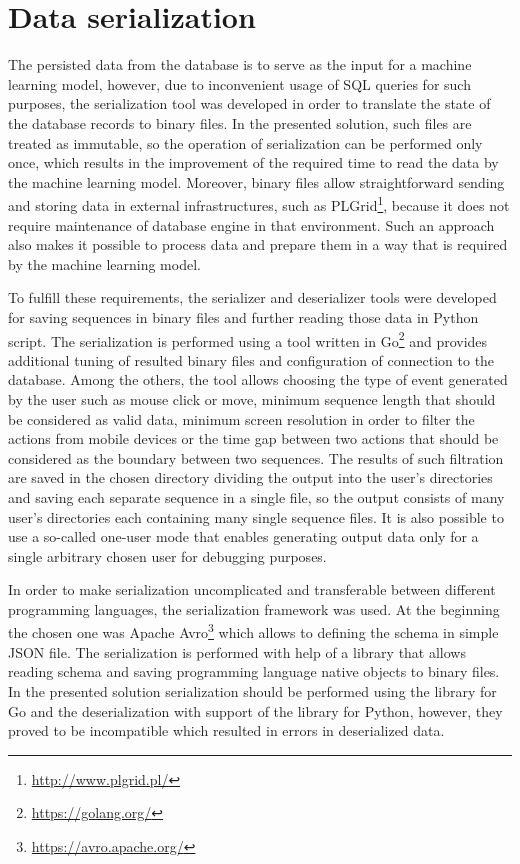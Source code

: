 
\section{Data serialization}\label{sec:data-serialization}
The persisted data from the database is to serve as the input for a machine learning model, however, due to inconvenient usage of SQL queries for such purposes, the serialization tool was developed in order to translate the state of the database records to binary files.
In the presented solution, such files are treated as immutable, so the operation of serialization can be performed only once, which results in the improvement of the required time to read the data by the machine learning model.
Moreover, binary files allow straightforward sending and storing data in external infrastructures, such as PLGrid\footnote{\url{http://www.plgrid.pl/}}, because it does not require maintenance of database engine in that environment.
Such an approach also makes it possible to process data and prepare them in a way that is required by the machine learning model.

To fulfill these requirements, the serializer and deserializer tools were developed for saving sequences in binary files and further reading those data in Python script.
The serialization is performed using a tool written in Go\footnote{\url{https://golang.org/}} and provides additional tuning of resulted binary files and configuration of connection to the database.
Among the others, the tool allows choosing the type of event generated by the user such as mouse click or move, minimum sequence length that should be considered as valid data, minimum screen resolution in order to filter the actions from mobile devices or the time gap between two actions that should be considered as the boundary between two sequences.
The results of such filtration are saved in the chosen directory dividing the output into the user's directories and saving each separate sequence in a single file, so the output consists of many user's directories each containing many single sequence files.
It is also possible to use a so-called one-user mode that enables generating output data only for a single arbitrary chosen user for debugging purposes.

In order to make serialization uncomplicated and transferable between different programming languages, the serialization framework was used.
At the beginning the chosen one was Apache Avro\footnote{\url{https://avro.apache.org/}} which allows to defining the schema in simple JSON file.
The serialization is performed with help of a library that allows reading schema and saving programming language native objects to binary files.
In the presented solution serialization should be performed using the library for Go and the deserialization with support of the library for Python, however, they proved to be incompatible which resulted in errors in deserialized data.

